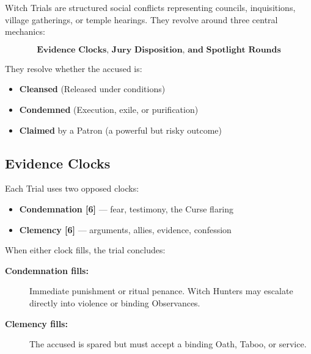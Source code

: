 \documentclass[11pt]{book}
\begin{document}
\begin{tcolorbox}[colback=flame!3,colframe=inkblack,
title={\textbf{Witch Trials} --- Social Conflict at the Edge of Faith and Fear}]

Witch Trials are structured social conflicts representing councils, inquisitions,  
village gatherings, or temple hearings. They revolve around three central mechanics:

\[
\textbf{Evidence Clocks, Jury Disposition, and Spotlight Rounds}
\]

They resolve whether the accused is:
\begin{itemize}[leftmargin=1.5em]
    \item \textbf{Cleansed} (Released under conditions)
    \item \textbf{Condemned} (Execution, exile, or purification)
    \item \textbf{Claimed} by a Patron (a powerful but risky outcome)
\end{itemize}

\end{tcolorbox}


\subsection*{Evidence Clocks}
Each Trial uses two opposed clocks:

\begin{itemize}[leftmargin=1.5em]
    \item \textbf{Condemnation [6]} --- fear, testimony, the Curse flaring
    \item \textbf{Clemency [6]} --- arguments, allies, evidence, confession
\end{itemize}

When either clock fills, the trial concludes:

\begin{description}
    \item[\textbf{Condemnation fills:}] Immediate punishment or ritual penance.  
    Witch Hunters may escalate directly into violence or binding Observances.

    \item[\textbf{Clemency fills:}]  
    The accused is spared but must accept a binding Oath, Taboo, or service.

\end{description}
\end{document}
